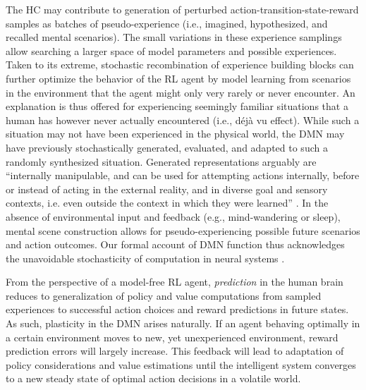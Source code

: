 \documentclass[10pt,letterpaper]{article}
\begin{document}
The HC may contribute to generation of
perturbed action-transition-state-reward samples
as batches of pseudo-experience
(i.e., imagined, hypothesized, and recalled mental scenarios).
The small variations in these experience samplings allow searching
a larger space of model parameters and possible experiences.
Taken to its extreme, stochastic recombination of experience
building blocks can further optimize the behavior of the RL agent
by model learning from scenarios in the environment that the agent might
only very rarely or never encounter.
An explanation is thus offered for experiencing seemingly familiar situations that
a human has however never actually encountered (i.e., d\'{e}j\`{a} vu effect).
While such a situation may not have been experienced in the physical world,
the DMN may have previously stochastically generated, evaluated, and adapted to
such a randomly synthesized situation.
Generated representations arguably are ``internally manipulable,
and can be used for attempting actions internally,
before or instead of acting in the external reality,
and in diverse goal and sensory contexts, i.e. even outside the context in which they were learned''
\citep{pezzulo2011grounding}.
In the absence of environmental input and feedback
(e.g., mind-wandering or sleep),
mental scene construction allows for pseudo-experiencing possible
future scenarios and action outcomes.
Our formal account of DMN function
thus acknowledges the unavoidable stochasticity of
computation in neural systems \citep{faisal2008noise}.


From the perspective of a model-free RL agent,
\textit{prediction} in the human brain reduces to
generalization of
policy and value computations from sampled experiences to
successful action choices and reward predictions in future states.
As such,
plasticity in the DMN arises naturally.
If an agent behaving optimally in a certain environment moves
to new, yet unexperienced environment, reward prediction errors will
largely increase.
This feedback will lead to adaptation of policy considerations
and value estimations until the intelligent system converges to a
new steady state of optimal action decisions in a volatile world.



\end{document}
